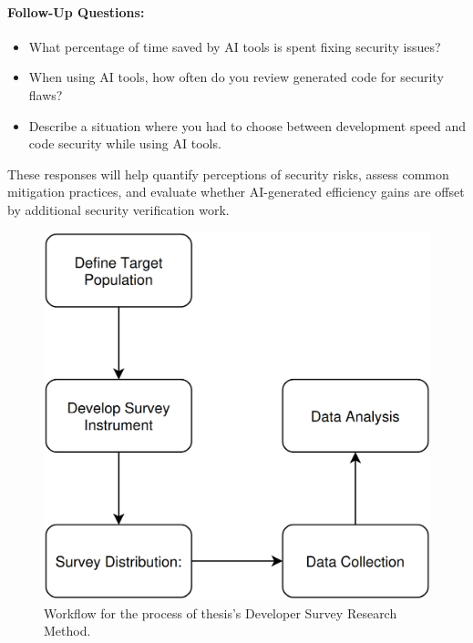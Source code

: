 \paragraph{Follow-Up Questions:}
\begin{itemize}
    \item What percentage of time saved by AI tools is spent fixing security issues?
    \item When using AI tools, how often do you review generated code for security flaws?
    \item Describe a situation where you had to choose between development speed and code security while using AI tools.
\end{itemize}

These responses will help quantify perceptions of security risks, assess common mitigation practices, and evaluate whether AI-generated efficiency gains are offset by additional security verification work.


\begin{figure}[H]
    \centering
    \includegraphics[width=0.9\columnwidth]{assets/survay-workflow.png}
    \caption{Workflow for the process of thesis's Developer Survey Research Method.}
    \label{fig:workflow_diagram}
\end{figure}


